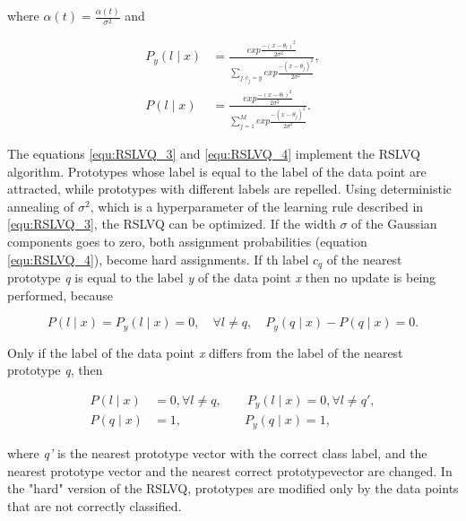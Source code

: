 \documentclass[12pt,oneside,a4paper,parskip]{scrbook}
\begin{document}
where $\alpha(t) = \frac{\alpha(t)}{\sigma^2}$ and

\begin{equation}
  \begin{split}
    P_y(l\mid x) &= \frac{exp \frac{-(x-\theta_l)^2}{2\sigma^2}}{\displaystyle\sum_{j:c_j = y} exp \frac{-(x-\theta_j)^2}{2\sigma^2}}, \\
    P(l\mid x) &= \frac{exp \frac{-(x-\theta_l)^2}{2\sigma^2}}{\displaystyle\sum_{j=1}^{M} exp \frac{-(x-\theta_j)^2}{2\sigma^2}}.
  \end{split}
  \label{equ:RSLVQ_4}
\end{equation}

The equations \ref{equ:RSLVQ_3} and \ref{equ:RSLVQ_4} implement the RSLVQ algorithm. Prototypes whose label is equal to 
the label of the data point are attracted, while prototypes with different labels are repelled. Using deterministic annealing
of $\sigma^2$, which is a hyperparameter of the learning rule described in \ref{equ:RSLVQ_3}, the RSLVQ can be optimized.
If the width $\sigma$ of the Gaussian components goes to zero, both assignment probabilities (equation \ref{equ:RSLVQ_4}),
become hard assignments. If th label $c_q$ of the nearest prototype \textit{q} is equal to the label \textit{y} of the data
point \textit{x} then no update is being performed, because 

\begin{equation}
  P(l\mid x) = P_y(l\mid x) = 0, \quad \forall l \neq q, \quad P_y(q\mid x)-P(q\mid x) = 0.
\end{equation}

Only if the label of the data point \textit{x} differs from the label of the nearest prototype \textit{q}, then

\begin{equation}
  \begin{split}
    P(l\mid x) &= 0, \forall l \neq q, \quad \quad P_y(l\mid x) = 0, \forall l \neq q',\\
    P(q\mid x) &= 1, \quad \quad \quad \quad \quad P_y(q\mid x) = 1,
  \end{split}
\end{equation}

where \textit{q'} is the nearest prototype vector with the correct class label, and the nearest prototype vector and the 
nearest correct prototypevector are changed. In the "hard" version of the RSLVQ, prototypes are modified only by the data 
points that are not correctly classified. \cite{RSLVQOrig}
\end{document}
